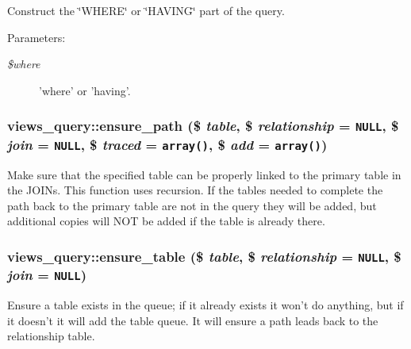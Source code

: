 Construct the \char`\"{}WHERE\char`\"{} or \char`\"{}HAVING\char`\"{} part of the query.

\begin{Desc}
\item[Parameters:]
\begin{description}
\item[{\em \$where}]'where' or 'having'. \end{description}
\end{Desc}
\hypertarget{classviews__query_2571123727140d93d8ee3357968a626e}{
\subsubsection[{ensure\_\-path}]{\setlength{\rightskip}{0pt plus 5cm}views\_\-query::ensure\_\-path (\$ {\em table}, \/  \$ {\em relationship} = {\tt NULL}, \/  \$ {\em join} = {\tt NULL}, \/  \$ {\em traced} = {\tt array()}, \/  \$ {\em add} = {\tt array()})}}
\label{classviews__query_2571123727140d93d8ee3357968a626e}


Make sure that the specified table can be properly linked to the primary table in the JOINs. This function uses recursion. If the tables needed to complete the path back to the primary table are not in the query they will be added, but additional copies will NOT be added if the table is already there. \hypertarget{classviews__query_78c615fc19826e8a640ab27874e2fdaf}{
\subsubsection[{ensure\_\-table}]{\setlength{\rightskip}{0pt plus 5cm}views\_\-query::ensure\_\-table (\$ {\em table}, \/  \$ {\em relationship} = {\tt NULL}, \/  \$ {\em join} = {\tt NULL})}}
\label{classviews__query_78c615fc19826e8a640ab27874e2fdaf}


Ensure a table exists in the queue; if it already exists it won't do anything, but if it doesn't it will add the table queue. It will ensure a path leads back to the relationship table.


